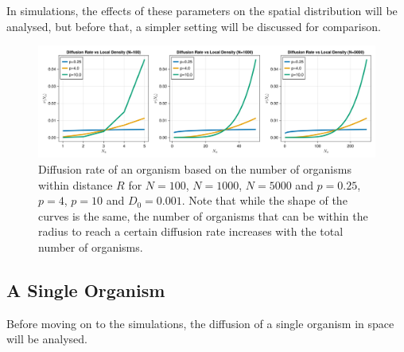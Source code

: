 \documentclass{article}
\begin{document}
In simulations, the effects of these parameters on the spatial distribution will be analysed, but before that, a simpler setting will be discussed for comparison.
\begin{figure}
    \label{diffusion_rates} 
    \centering
    \includegraphics[width=1.0\linewidth]{img/diffusion_rates.png}
    \caption{Diffusion rate of an organism based on the number of organisms within distance $R$ for $N=100$, $N=1000$, $N=5000$ and $p=0.25$, $p=4$, $p=10$ and $D_0 = 0.001$. Note that while the shape of the curves is the same, the number of organisms that can be within the radius to reach a certain diffusion rate increases with the total number of organisms.}
\end{figure}

\subsection{A Single Organism}
Before moving on to the simulations, the diffusion of a single organism in space will be analysed.
\end{document}
